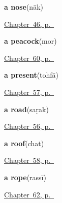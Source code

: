 \noindent\begin{minipage}[t]{\linewidth}
\raggedright
\textbf{a nose}\enspace\emph{}\enspace(nāk)\par
\footnotesize \hyperref[ch:hi-body-more]{Chapter~46, p.~\pageref*{ch:hi-body-more}}
\end{minipage}\par\smallskip

\noindent\begin{minipage}[t]{\linewidth}
\raggedright
\textbf{a peacock}\enspace\emph{}\enspace(mor)\par
\footnotesize \hyperref[ch:hi-animals-in-the-yard]{Chapter~60, p.~\pageref*{ch:hi-animals-in-the-yard}}
\end{minipage}\par\smallskip

\noindent\begin{minipage}[t]{\linewidth}
\raggedright
\textbf{a present}\enspace\emph{}\enspace(tohfā)\par
\footnotesize \hyperref[ch:hi-a-gift-and-a-feast]{Chapter~57, p.~\pageref*{ch:hi-a-gift-and-a-feast}}
\end{minipage}\par\smallskip

\noindent\begin{minipage}[t]{\linewidth}
\raggedright
\textbf{a road}\enspace\emph{}\enspace(saṛak)\par
\footnotesize \hyperref[ch:hi-the-road]{Chapter~56, p.~\pageref*{ch:hi-the-road}}
\end{minipage}\par\smallskip

\noindent\begin{minipage}[t]{\linewidth}
\raggedright
\textbf{a roof}\enspace\emph{}\enspace(chat)\par
\footnotesize \hyperref[ch:hi-inside-the-house]{Chapter~58, p.~\pageref*{ch:hi-inside-the-house}}
\end{minipage}\par\smallskip

\noindent\begin{minipage}[t]{\linewidth}
\raggedright
\textbf{a rope}\enspace\emph{}\enspace(rassī)\par
\footnotesize \hyperref[ch:hi-what-hands-work-with]{Chapter~62, p.~\pageref*{ch:hi-what-hands-work-with}}
\end{minipage}\par\smallskip

